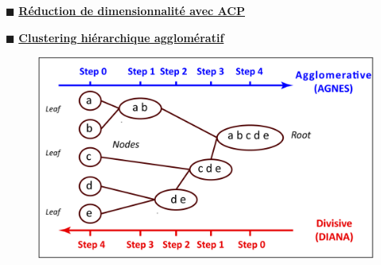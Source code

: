 \documentclass[aspectratio=169,professionalfonts, 12pt]{beamer}
\begin{document}
\begin{frame}
  \(\displaystyle \blacksquare \) \textbf{\underline{Réduction de dimensionnalité avec ACP}} \\
  \vspace{0.5em}
  \justifying
  \begin{minipage}{\textwidth}
    \begin{figure}[H]
      \centering
      \qquad
    \end{figure}
  \end{minipage}
\end{frame}

\begin{frame}
  \(\displaystyle \blacksquare \) \textbf{\underline{Clustering hiérarchique agglomératif}} \\
  \justifying 
  \begin{minipage}{\textwidth}
    \begin{figure}[H]
      \begin{center}
        \includegraphics[scale=0.18]{images/contribution/hierarchical_agglo_divisive.png}
      \end{center}
    \end{figure}
  \end{minipage}
\end{frame}
\end{document}
